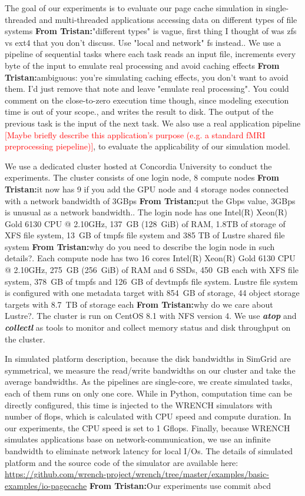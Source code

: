 \documentclass[conference]{IEEEtran}
\newcommand{\tristan}[1]{\color{orange}\textbf{From Tristan:}#1\color{black}}
\begin{document}
        	The goal of our experiments is to evaluate our page cache 
			simulation in single-threaded and multi-threaded applications
			accessing data on different types of file systems \tristan{"different types" is vague, first thing I thought of was zfs vs ext4 that you don't discuss. Use "local and network" fs instead.}. 
			We use a pipeline
			of sequential tasks where each task reads an input file, increments
			every byte of the input to emulate real processing and avoid caching
			effects \tristan{ambiguous: you're simulating caching effects, you don't want to avoid them. I'd just remove that note and leave "emulate real processing". You could comment on 
			the close-to-zero execution time though, since modeling execution time is out of your scope.}, and writes the result to disk. The output of the previous
			task is the input of the next task. We also use a real application 
            pipeline \textcolor{red}{[Maybe briefly describe this application's purpose (e.g. a standard fMRI preprocessing piepeline)]}, to evaluate the applicability of our simulation model. 
			
			We use a dedicated cluster hosted at Concordia University to conduct 
			the experiments. The cluster consists of one login node, 8 compute nodes \tristan{it now has 9 if you add the GPU node}
			and 4 storage nodes connected with a network bandwidth of 3GBps \tristan{put the Gbps value, 3GBps is unusual as a network bandwidth.}. 
			The login node has one Intel(R) Xeon(R) Gold 6130 CPU @ 2.10GHz, 
			137~GB (128~GiB) of RAM, 1.8TB of storage of XFS file system, 
			13~GB of tmpfs file system and 385 TB of Lustre shared file system \tristan{why do you need to describe the login node in such details?}. 
			Each compute node has two 16 cores Intel(R) Xeon(R) Gold 6130 CPU @ 2.10GHz, 
			275~GB (256~GiB) of RAM and 6 SSDs, 450~GB each with XFS file system, 
			378~GB of tmpfs and 126~GB of devtmpfs file system.
			Lustre file system is configured with one metadata target with 854~GB 
			of storage, 44 object storage targets with 8.7~TB of storage each \tristan{why do we care about Lustre?}. 
			The cluster is run on CentOS 8.1 with NFS version 4. 
			We use \textbf{\textit{atop}} and \textbf{\textit{collectl}} as tools to 
			monitor and collect memory status and disk throughput 
			on the cluster. 
			
			In simulated platform description, because the disk bandwidths in SimGrid 
			are symmetrical, we measure the read/write bandwidths on our cluster and 
			take the average bandwidths. 
			As the pipelines are single-core, we create simulated tasks, 
			each of them runs on only one core. 
			While in Python, computation time can be directly configured, 
			this time is injected to the WRENCH simulators with number of flops, 
			which is calculated with CPU speed and compute duration. 
			In our experiments, the CPU speed is set to 1 Gflops. 
			Finally, because WRENCH simulates applications base on network-communication, 
			we use an infinite bandwidth to eliminate network latency for local I/Os.
			The details of simulated platform and the source code of the simulator 
			are available here: 
			\url{https://github.com/wrench-project/wrench/tree/master/examples/basic-examples/io-pagecache}
			\tristan{Our experiments use commit abcd}
			
\end{document}
